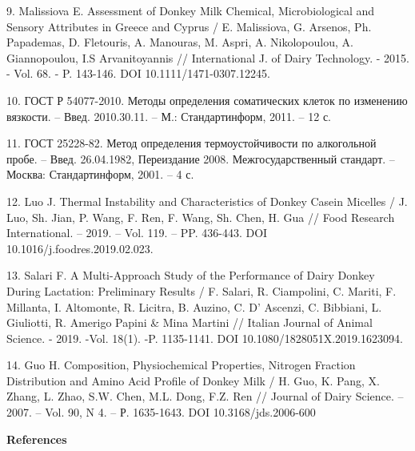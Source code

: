 \begin{noparindent}
9. Malissiova E. Assessment of Donkey Milk Chemical, Microbiological and
Sensory Attributes in Greece and Cyprus / E. Malissiova, G. Arsenos, Ph.
Papademas, D. Fletouris, A. Manouras, M. Aspri, A. Nikolopoulou, A.
Giannopoulou, I.S Arvanitoyannis // International J. of Dairy
Technology. - 2015. - Vol. 68. - P. 143-146. DOI
10.1111/1471-0307.12245.

10. ГОСТ Р 54077-2010. Методы определения соматических клеток по
изменению вязкости. -- Введ. 2010.30.11. -- М.: Стандартинформ, 2011. --
12 с.

11. ГОСТ 25228-82. Метод определения термоустойчивости по алкогольной
пробе. -- Введ. 26.04.1982, Переиздание 2008. Межгосударственный
стандарт. -- Москва: Стандартинформ, 2001. -- 4 с.

12. Luo J. Thermal Instability and Characteristics of Donkey Casein
Micelles / J. Luo, Sh. Jian, P. Wang, F. Ren, F. Wang, Sh. Chen, H. Gua
// Food Research International. -- 2019. -- Vol. 119. -- PP. 436-443.
DOI 10.1016/j.foodres.2019.02.023.

13. Salari F. A Multi-Approach Study of the Performance of Dairy Donkey
During Lactation: Preliminary Results / F. Salari, R. Ciampolini, C.
Mariti, F. Millanta, I. Altomonte, R. Licitra, B. Auzino, C. D' Ascenzi,
C. Bibbiani, L. Giuliotti, R. Amerigo Papini \& Mina Martini // Italian
Journal of Animal Science. - 2019. -Vol. 18(1). -P. 1135-1141. DOI
10.1080/1828051X.2019.1623094.

14. Guo H. Composition, Physiochemical Properties, Nitrogen Fraction
Distribution and Amino Acid Profile of Donkey Milk / H. Guo, K. Pang, X.
Zhang, L. Zhao, S.W. Chen, M.L. Dong, F.Z. Ren // Journal of Dairy
Science. -- 2007. -- Vol. 90, N 4. -- Р. 1635-1643. DOI
10.3168/jds.2006-600
\end{noparindent}
\newpage
\begin{center}
{\bfseries References}
\end{center}

